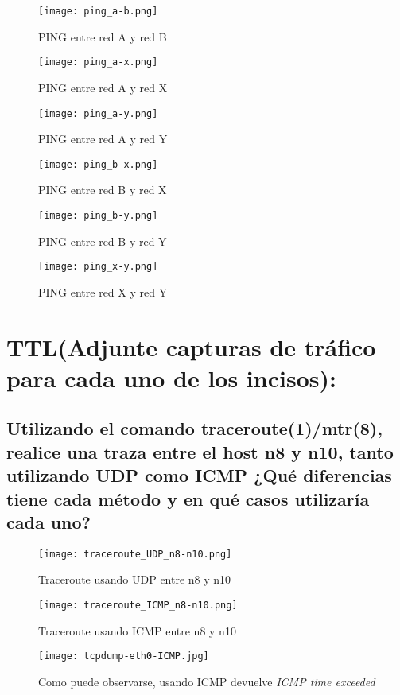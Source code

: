 \documentclass[11pt]{article} %
\begin{document}
        \begin{figure}[htbp]
            \centering
            \texttt{[image: ping\_a-b.png]}
            \caption{PING entre red A y red B}
            \label{fig:ping_a-b}
        \end{figure}
        \begin{figure}[htbp]
            \centering
            \texttt{[image: ping\_a-x.png]}
            \caption{PING entre red A y red X}
            \label{fig:ping_a-x}
        \end{figure}
        \begin{figure}[htbp]
            \centering
            \texttt{[image: ping\_a-y.png]}
            \caption{PING entre red A y red Y}
            \label{fig:ping_a-y}
        \end{figure}
        \begin{figure}[htbp]
            \centering
            \texttt{[image: ping\_b-x.png]}
            \caption{PING entre red B y red X}
            \label{fig:ping_b-x}
        \end{figure}
        \begin{figure}[htbp]
            \centering
            \texttt{[image: ping\_b-y.png]}
            \caption{PING entre red B y red Y}
            \label{fig:ping_b-y}
        \end{figure}
        \begin{figure}[htbp]
            \centering
            \texttt{[image: ping\_x-y.png]}
            \caption{PING entre red X y red Y}
            \label{fig:ping_x-y}
        \end{figure}

    \section{TTL(Adjunte capturas de tráfico para cada uno de los incisos):}
        \subsection{Utilizando el comando traceroute(1)/mtr(8), realice una traza entre el host n8 y n10, tanto utilizando UDP como ICMP ¿Qué diferencias tiene cada método y en qué casos utilizaría cada uno?}

        \begin{figure}[htbp]
            \centering
            \texttt{[image: traceroute\_UDP\_n8-n10.png]}
            \caption{Traceroute usando UDP entre n8 y n10}
            \label{fig:traceroute_UDP_n8-n10}
        \end{figure}
        \begin{figure}[htbp]
            \centering
            \texttt{[image: traceroute\_ICMP\_n8-n10.png]}
            \caption{Traceroute usando ICMP entre n8 y n10}
            \label{fig:traceroute_ICMP_n8-n10}
        \end{figure}
        \begin{figure}[H]
            \centering
            \texttt{[image: tcpdump-eth0-ICMP.jpg]}
            \caption{Como puede observarse, usando ICMP devuelve \textit{ICMP time exceeded}}
            \label{tcpdump-eth0-ICMP}
        \end{figure}
\end{document}
